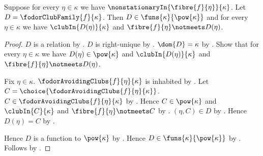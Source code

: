 \begin{theorem}\label{fodor_club_family_type}
    Suppose for every $\eta\in\kappa$ we have
        $\nonstationaryIn{\fibre{f}{\eta}}{\kappa}$.
    Let $D=\fodorClubFamily{f}{\kappa}$.
    Then $D\in\funs{\kappa}{\pow{\kappa}}$ and
        for every $\eta\in\kappa$ we have
            $\clubIn{D(\eta)}{\kappa}$ and
            $\fibre{f}{\eta}\notmeets D(\eta)$.
\end{theorem}
\begin{proof}
    $D$ is a relation by .
    $D$ is right-unique
        by .
    $\dom{D}=\kappa$
        by .
    Show that for every $\eta\in\kappa$ we have
        $D(\eta)\in\pow{\kappa}$ and
        $\clubIn{D(\eta)}{\kappa}$ and
        $\fibre{f}{\eta}\notmeets D(\eta)$.
    \begin{subproof}
        Fix $\eta\in\kappa$.
        $\fodorAvoidingClubs{f}{\eta}{\kappa}$ is inhabited
            by .
        Let $C=\choice{\fodorAvoidingClubs{f}{\eta}{\kappa}}$.
        $C\in\fodorAvoidingClubs{f}{\eta}{\kappa}$
            by .
        Hence $C\in\pow{\kappa}$ and $\clubIn{C}{\kappa}$ and
            $\fibre{f}{\eta}\notmeets C$
            by .
        $(\eta,C)\in D$ by .
        Hence $D(\eta)=C$ by .
    \end{subproof}
    Hence $D$ is a function to $\pow{\kappa}$ by \auto.
    Hence $D\in\funs{\kappa}{\pow{\kappa}}$
        by .
    Follows by \auto.
\end{proof}

